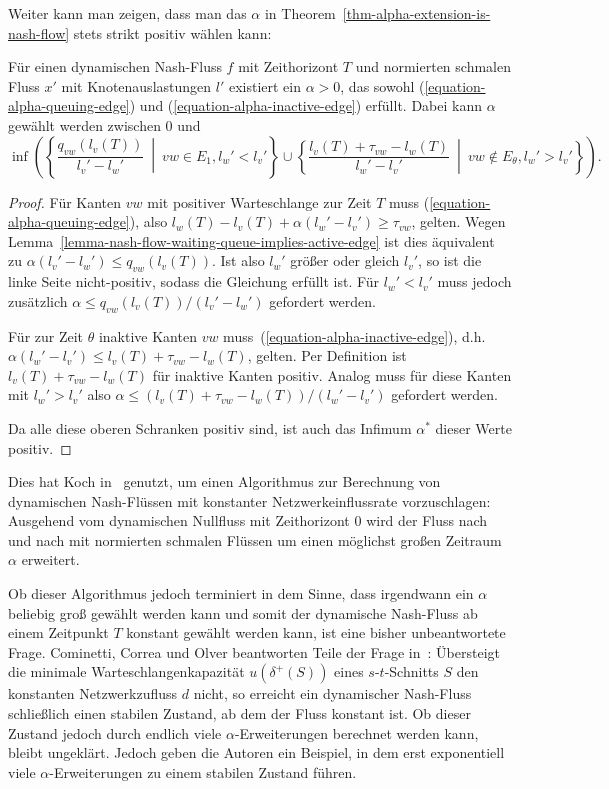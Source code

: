 Weiter kann man zeigen, dass man das $\alpha$ in Theorem~\ref{thm-alpha-extension-is-nash-flow} stets strikt positiv wählen kann:
\begin{proposition}
	Für einen dynamischen Nash-Fluss $f$ mit Zeithorizont $T$ und normierten schmalen Fluss $x'$ mit Knotenauslastungen $l'$ existiert ein $\alpha>0$, das sowohl (\ref{equation-alpha-queuing-edge}) und (\ref{equation-alpha-inactive-edge}) erfüllt.
	Dabei kann $\alpha$ gewählt werden zwischen $0$ und \[
	\inf\left(\left\{ \frac{q_{vw}(l_v(T))}{l_v' - l_w'} ~\middle|~ vw\in E_1, l_w' < l_v' \right\} \cup \left\{ \frac{l_v(T) + \tau_{vw} -l_w(T)}{l_w' - l_v'} ~\middle|~ vw\notin E_\theta, l_w' > l_v' \right\}\right).
	\]
\end{proposition}
\begin{proof}
	Für Kanten $vw$ mit positiver Warteschlange zur Zeit $T$ muss (\ref{equation-alpha-queuing-edge}), also $l_w(T) - l_v(T) + \alpha(l_w' - l_v') \geq \tau_{vw}$, gelten.
	Wegen Lemma~\ref{lemma-nash-flow-waiting-queue-implies-active-edge} ist dies äquivalent zu $\alpha(l_v' - l_w') \leq q_{vw}(l_v(T))$.
	Ist also $l_w'$ größer oder gleich $l_v'$, so ist die linke Seite nicht-positiv, sodass die Gleichung erfüllt ist.
	Für $l_w' < l_v'$ muss jedoch zusätzlich $\alpha\leq q_{vw}(l_v(T)) / (l_v' - l_w')$ gefordert werden.
	
	Für zur Zeit $\theta$ inaktive Kanten $vw$ muss~(\ref{equation-alpha-inactive-edge}), d.h. $\alpha(l_w' -l_v') \leq l_v(T) + \tau_{vw} - l_w(T)$, gelten.
	Per Definition ist $l_v(T) + \tau_{vw} - l_w(T)$ für inaktive Kanten positiv.
	Analog muss für diese Kanten mit $l_w' > l_v'$ also $\alpha \leq (l_v(T) + \tau_{vw} -l_w(T))/(l_w' - l_v')$ gefordert werden.
	
	Da alle diese oberen Schranken positiv sind, ist auch das Infimum $\alpha^*$ dieser Werte positiv.
\end{proof}

Dies hat Koch in~\cite{Koch2011} genutzt, um einen Algorithmus zur Berechnung von dynamischen Nash-Flüssen mit konstanter Netzwerkeinflussrate vorzuschlagen:
Ausgehend vom dynamischen Nullfluss mit Zeithorizont $0$ wird der Fluss nach und nach mit normierten schmalen Flüssen um einen möglichst großen Zeitraum $\alpha$ erweitert.

Ob dieser Algorithmus jedoch terminiert in dem Sinne, dass irgendwann ein $\alpha$ beliebig groß gewählt werden kann und somit der dynamische Nash-Fluss ab einem Zeitpunkt $T$ konstant gewählt werden kann, ist eine bisher unbeantwortete Frage.
Cominetti, Correa und Olver beantworten Teile der Frage in~\cite{CominettiExample}:
Übersteigt die minimale Warteschlangenkapazität $u(\delta^+(S))$ eines $s$-$t$-Schnitts $S$ den konstanten Netzwerkzufluss $d$ nicht, so erreicht ein dynamischer Nash-Fluss schließlich einen stabilen Zustand, ab dem der Fluss konstant ist.
Ob dieser Zustand jedoch durch endlich viele $\alpha$-Erweiterungen berechnet werden kann, bleibt ungeklärt.
Jedoch geben die Autoren ein Beispiel, in dem erst exponentiell viele $\alpha$-Erweiterungen zu einem stabilen Zustand führen.

